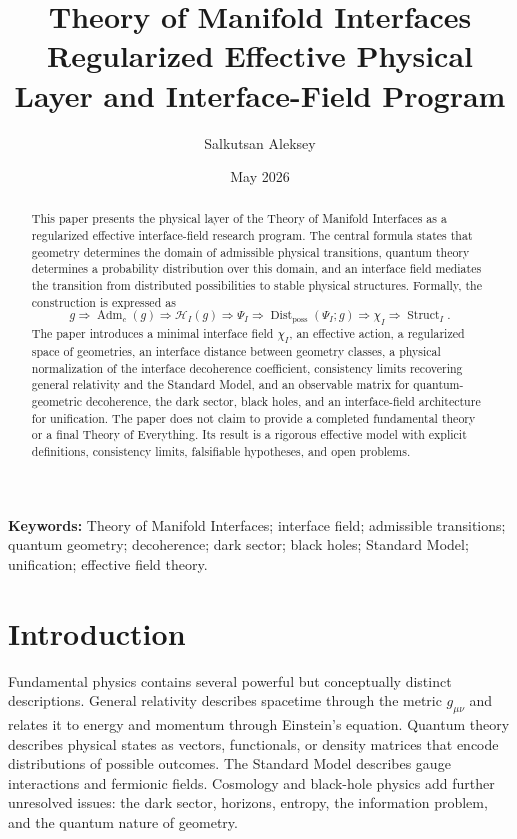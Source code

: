 \documentclass[12pt,a4paper]{article}
\title{\textbf{Theory of Manifold Interfaces}\\
\large Regularized Effective Physical Layer and Interface-Field Program}
\author{Salkutsan Aleksey}
\date{May 2026}
\DeclareMathOperator{\Adm}{Adm}
\DeclareMathOperator{\Struct}{Struct}
\DeclareMathOperator{\Dist}{Dist}
\newcommand{\Hilb}{\mathcal H}
\begin{document}
\maketitle

\begin{abstract}
This paper presents the physical layer of the Theory of Manifold Interfaces as a regularized effective interface-field research program. The central formula states that geometry determines the domain of admissible physical transitions, quantum theory determines a probability distribution over this domain, and an interface field mediates the transition from distributed possibilities to stable physical structures. Formally, the construction is expressed as
\[
 g\Rightarrow\Adm_c(g)\Rightarrow\Hilb_I(g)\Rightarrow\Psi_I
 \Rightarrow\Dist_{\mathrm{poss}}(\Psi_I;g)\Rightarrow\chi_I\Rightarrow\Struct_I.
\]
The paper introduces a minimal interface field $\chi_I$, an effective action, a regularized space of geometries, an interface distance between geometry classes, a physical normalization of the interface decoherence coefficient, consistency limits recovering general relativity and the Standard Model, and an observable matrix for quantum-geometric decoherence, the dark sector, black holes, and an interface-field architecture for unification. The paper does not claim to provide a completed fundamental theory or a final Theory of Everything. Its result is a rigorous effective model with explicit definitions, consistency limits, falsifiable hypotheses, and open problems.
\end{abstract}

\noindent\textbf{Keywords:} Theory of Manifold Interfaces; interface field; admissible transitions; quantum geometry; decoherence; dark sector; black holes; Standard Model; unification; effective field theory.

\tableofcontents
\newpage

\section{Introduction}
Fundamental physics contains several powerful but conceptually distinct descriptions. General relativity describes spacetime through the metric $g_{\mu\nu}$ and relates it to energy and momentum through Einstein's equation. Quantum theory describes physical states as vectors, functionals, or density matrices that encode distributions of possible outcomes. The Standard Model describes gauge interactions and fermionic fields. Cosmology and black-hole physics add further unresolved issues: the dark sector, horizons, entropy, the information problem, and the quantum nature of geometry.
\end{document}
